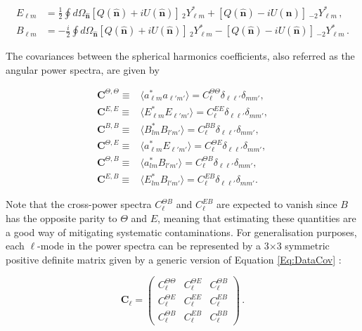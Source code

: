 \begin{align}
E_{\ell m} & = \frac{1}{2}\oint d\Omega_{\hat{\mathbf{n}}} \left[ Q(\hat{\mathbf{n}}) + iU(\hat{\mathbf{n}}) \right]\,_2Y^*_{\ell m} + \left[ Q(\hat{\mathbf{n}}) - iU(\hat{\mathbf{n}}) \right]\,_{-2}Y^*_{\ell m} \, ,\\
B_{\ell m} & = -\frac{i}{2}\oint d\Omega_{\hat{\mathbf{n}}} \left[ Q(\hat{\mathbf{n}}) + iU(\hat{\mathbf{n}}) \right]\,_2Y^*_{\ell m} - \left[ Q(\hat{\mathbf{n}}) - iU(\hat{\mathbf{n}}) \right]\,_{-2}Y^*_{\ell m}\, .
\end{align}

\qquad The covariances between the spherical harmonics coefficients, also referred as the angular power spectra, are given by

\begin{align}
\label{eqn::chCmbPol_psTT}
\textbf{C}^{\Theta,\Theta}  \equiv & \langle a_{\ell m}^{*} a_{\ell'm'} \rangle  = C_{\ell}^{\Theta\Theta}\delta_{\ell\ell'}\delta_{mm'},\\
\label{eqn::chCmbPol_psEE}
\textbf{C}^{E,E} \equiv & \langle E_{\ell m}^{*} E_{\ell'm'} \rangle = C_{\ell}^{EE}\delta_{\ell\ell'}\delta_{mm'},\\
\label{eqn::chCmbPol_psBB}
\textbf{C}^{B,B} \equiv &\langle B_{lm}^{*} B_{l'm'} \rangle = C_{\ell}^{BB}\delta_{\ell\ell'}\delta_{mm'},\\
\label{eqn::chCmbPol_psTE}
\textbf{C}^{\Theta,E} \equiv & \langle a_{\ell m}^{*} E_{\ell'm'} \rangle = C_{\ell}^{\Theta E}\delta_{\ell\ell'}\delta_{mm'}, \\
\textbf{C}^{\Theta,B} \equiv &\langle a_{lm}^{*} B_{l'm'} \rangle = C_{\ell}^{\Theta B}\delta_{\ell\ell'}\delta_{mm'},\\
\textbf{C}^{E,B} \equiv &\langle E_{lm}^{*} B_{l'm'} \rangle = C_{\ell}^{EB}\delta_{\ell\ell'}\delta_{mm'}.
\end{align}

\qquad Note that the cross-power spectra $ C_{\ell}^{\Theta B}$ and $C_{\ell}^{EB}$ are expected to vanish since $B$ has the opposite parity to $\Theta$ and $E$, meaning that estimating these quantities are a good way of mitigating systematic contaminations. For generalisation purposes, each $\ell$-mode in the power spectra can be represented by a 3$\times$3 symmetric positive definite matrix given by a generic version of Equation \eqref{Eq:DataCov} :

\begin{equation}
\mathbf{C}_{\ell}=\left(
\begin{array}{ccc}
C_{\ell}^{\Theta\Theta} & C_{\ell}^{\Theta E} &  C_{\ell}^{\Theta B}\\
C_{\ell}^{\Theta E} & C_{\ell}^{EE} & C_{\ell}^{E B} \\
C_{\ell}^{\Theta B} & C_{\ell}^{E B} & C_{\ell}^{BB}
\end{array} \right)\, .
\label{Eq:Cl_blockDiag}
\end{equation}

